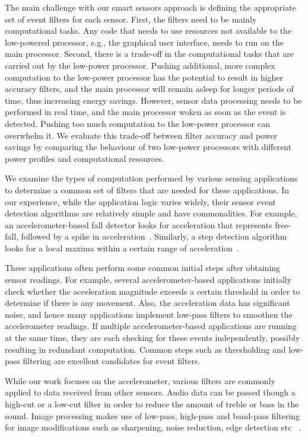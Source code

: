 The main challenge with our smart sensors approach is defining the
appropriate set of event filters for each sensor. First, the filters
need to be mainly computational tasks. Any code that needs to use
resources not available to the low-powered processor, e.g., the
graphical user interface, needs to run on the main processor. Second,
there is a trade-off in the computational tasks that are carried out
by the low-power processor. Pushing additional, more complex computation to the
low-power processor has the potential to result in higher accuracy filters,
and the main processor will remain asleep for longer periods of time,
thus increasing energy savings. However, sensor data processing needs to be
performed in real time, and the main processor woken as soon as the event 
is detected. Pushing too much computation to the low-power processor can overwhelm it.
We evaluate this trade-off between filter accuracy and power savings by comparing the
behaviour of two low-power processors with different power profiles and 
computational resources.




We examine the types of computation performed by various sensing applications to
determine a common set of filters that are needed for these applications. In our
experience, while the application logic varies widely, their sensor event
detection algorithms are relatively simple and have commonalities. For example,
an accelerometer-based fall detector looks for acceleration that represents
free-fall, followed by a spike in acceleration~\cite{kangasFallDetection}. Similarly, a step
detection algorithm looks for a local maxima within a certain range of
acceleration~\cite{libbyFootstepDetection}. 

These applications often perform some common initial steps after obtaining sensor 
readings. For example, several
accelerometer-based applications initially check whether the acceleration
magnitude exceeds a certain threshold in order to determine if there is any
movement. Also, the acceleration data has significant noise, and hence many
applications implement low-pass filters to smoothen the accelerometer readings.
If multiple accelerometer-based applications are running at the same time, they
are each checking for these events independently, possibly resulting in
redundant computation. Common steps such as thresholding and low-pass filtering
are excellent candidates for event filters.

While our work focuses on the accelerometer, various filters are commonly applied
to data received from other sensors. Audio data can be passed though a high-cut or
a low-cut filter in order to reduce the amount of treble or bass in the sound. Image 
processing makes use of low-pass, high-pass and band-pass filtering
for image modifications such as sharpening, noise reduction, edge detection etc
~\cite{paul2005computer,marr1980theory}. 